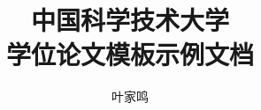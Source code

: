 \documentclass[master]{ustcthesis}
\title{中国科学技术大学\\学位论文模板示例文档}
\author{叶家鸣}
\begin{document}
%

\maketitle
\makestatement

\frontmatter

\tableofcontents


\mainmatter






\appendix


\backmatter


\end{document}
